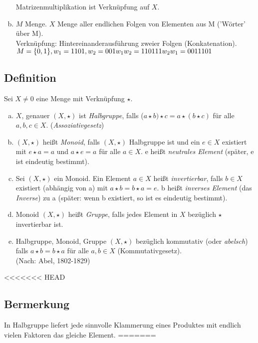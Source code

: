 \begin{enumerate}[a)]
Matrizenmultiplikation ist Verknüpfung auf $X$.
\item $M$ Menge. $X$ Menge aller endlichen Folgen von Elementen aus M ('Wörter' über M).\\
Verknüpfung: Hintereinanderausführung zweier Folgen (Konkatenation).\\
$M = \{0,1\}, w_1 = 1101, w_2 = 001\\
w_1w_2 = 110111\\
w_2w_1 = 0011101$\\
\end{enumerate}
\subsection{Definition}\label{sec:1.3}
Sei $X \ne 0$ eine Menge mit Verknüpfung $\star$.
\begin{enumerate}[a)]
\item $X$, genauer $(X,\star)$ ist \emph{Halbgruppe}, falls
($a \star b) \star c = a \star (b \star c)$ für alle $a,b,c \in X.$ (\emph{Assoziativgesetz})
\item $(X,\star)$ hei\ss t \emph{Monoid}, falls $(X,\star)$ Halbgruppe ist und ein $e \in X$ existiert mit $e \star a = a$ und $a \star e = a$ für alle $a \in X$. e hei\ss t \emph{neutrales Element} (später, e ist eindeutig bestimmt).
\item Sei $(X,\star)$ ein Monoid. Ein Element $a \in X$ hei\ss t \emph{invertierbar}, falls $b \in X$ existiert (abhängig von a) mit $a \star b = b \star a = e$. b hei\ss t \emph{inverses Element} (das \emph{Inverse}) zu a (später: wenn b existiert, so ist es eindeutig bestimmt).
\item Monoid $(X,\star)$ hei\ss t \emph{Gruppe}, falls jedes Element in $X$ bezüglich $\star$ invertierbar ist.
\item Halbgruppe, Monoid, Gruppe $(X,\star)$ bezüglich kommutativ (oder \emph{abelsch}) falls $a \star b = b \star a $ für alle $a,b \in X$ (Kommutativgesetz). \\(Nach: Abel, 1802-1829)
\end{enumerate}
<<<<<<< HEAD
\subsection{Bermerkung}\label{sec:1.4}
In Halbgruppe liefert jede sinnvolle Klammerung eines Produktes mit endlich vielen Faktoren das gleiche Element.
=======
